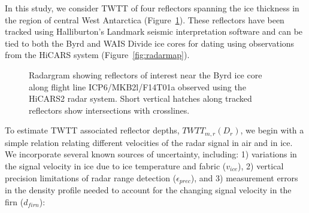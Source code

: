In this study, we consider TWTT of four reflectors spanning the ice thickness in the region of central West Antarctica (Figure~\ref{fig:layergram}). These reflectors have been tracked using Halliburton's Landmark seismic interpretation software and can be tied to both the Byrd and WAIS Divide ice cores for dating using observations from the HiCARS system (Figure~\ref{fig:radarmap}). %

\begin{figure}[h]
\centering
{}
\caption{Radargram showing reflectors of interest near the Byrd ice core along flight line ICP6/MKB2l/F14T01a observed using the HiCARS2 radar system. Short vertical hatches along tracked reflectors show intersections with crosslines.}
\label{fig:layergram}
\end{figure}


To estimate TWTT associated reflector depths, $TWTT_{m,r}(D_r)$, we begin with a simple relation relating different velocities of the radar signal in air and in ice. We incorporate several known sources of uncertainty, including: 1) variations in the signal velocity in ice due to ice temperature and fabric ($v_{ice}$), 2) vertical precision limitations of radar range detection ($\epsilon_{prec}$), and 3) measurement errors in the density profile needed to account for the changing signal velocity in the firn ($d_{firn}$):


